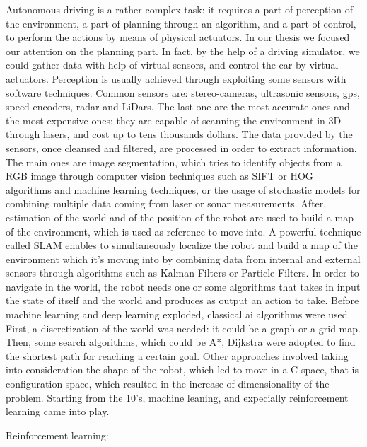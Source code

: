 Autonomous driving is a rather complex task: it requires a part of perception of the environment, a part of planning through an algorithm, and a part of control, to perform the actions by means of physical actuators. In our thesis we focused our attention on the planning part. In fact, by the help of a driving simulator, we could gather data with help of virtual sensors, and control the car by virtual actuators.
Perception is usually achieved through exploiting some sensors with software techniques.
Common sensors are: stereo-cameras, ultrasonic sensors, gps, speed encoders, radar and LiDars. The last one are the most accurate ones and the most expensive ones: they are capable of scanning the environment in 3D through lasers, and cost up to tens thousands dollars.
The data provided by the sensors, once cleansed and filtered, are processed in order to extract information. The main ones are image segmentation, which tries to identify objects from a RGB image through computer vision techniques such as SIFT or HOG algorithms and machine learning techniques, or the usage of stochastic models for combining multiple data coming from laser or sonar measurements.
After, estimation of the world and of the position of the robot are used to build a map of the environment, which is used as reference to move into.
A powerful technique called SLAM enables to simultaneously localize the robot and build a map of the environment which it's moving into by combining data from internal and external sensors through algorithms such as Kalman Filters or Particle Filters.
In order to navigate in the world, the robot needs one or some algorithms that takes in input the state of itself and the world and produces as output an action to take.
Before machine learning and deep learning exploded, classical ai algorithms were used.
First, a discretization of the world was needed: it could be a graph or a grid map. Then, some search algorithms, which could be A*, Dijkstra were adopted to find the shortest path for reaching a certain goal.
Other approaches involved taking into consideration the shape of the robot, which led to move in a C-space, that is configuration space, which resulted in the increase of dimensionality of the problem.
Starting from the 10's, machine leaning, and expecially reinforcement learning came into play.
	
	
Reinforcement learning:




